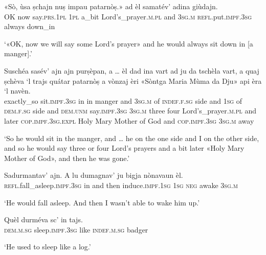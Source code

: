 \begin{linenumbers}
\gll  «Sò, ùsa ṣchajn nuṣ impau patarnòṣ.» ad èl samatév’ adina giùdajn.  \\
OK now say.\textsc{prs.1pl} \textsc{1pl} a\_bit  Lord’s\_prayer.\textsc{m.pl} and \textsc{3sg.m} \textsc{refl}.put.\textsc{impf.3sg} always down\_in  \\
\end{linenumbers}
\medskip
\glt `«OK, now we will say some Lord’s prayer» and he would always sit down in [a manger].'
\medskip

\begin{linenumbers}
\gll Suschéa sasév’ ajn ajn purṣèpan, a … èl dad ina vart ad ju da tschèla vart, a quaj ṣchèva `l trajs quátar  patarnòṣ a vònzaj èri «Sòntga Maria Mùma da Dju» api èra `l navèn.\\
exactly\_so sit.\textsc{impf.3sg} in in manger and {} \textsc{3sg.m} of \textsc{indef.f.sg} side and \textsc{1sg} of \textsc{dem.f.sg} side and \textsc{dem.unm} say.\textsc{impf.3sg} \textsc{3sg.m} three four Lord’s\_prayer.\textsc{m.pl} and later \textsc{cop.impf.3sg.expl} Holy Mary Mother of God and \textsc{cop.impf.3sg} \textsc{3sg.m} away\\
\end{linenumbers}
\medskip
\glt `So he would sit in the manger, and … he on the one side and I on the other side, and so he would say three or four Lord’s prayers and a bit later «Holy Mary Mother of God», and then he was gone.'
\medskip

\begin{linenumbers}
\gll  Sadurmantav’ ajn. A lu dumagnav’ ju bigja nònavaun èl.  \\
 \textsc{refl}.fall\_asleep.\textsc{impf.3sg} in and then induce.\textsc{impf.1sg} \textsc{1sg} \textsc{neg} awake \textsc{3sg.m}\\
\end{linenumbers}
\medskip
\glt `He would fall asleep. And  then I wasn't able to wake him up.'
\medskip

\begin{linenumbers}
\gll  Quèl durméva sc’ in tajs.  \\
 \textsc{dem.m.sg} sleep.\textsc{impf.3sg} like \textsc{indef.m.sg} badger\\
\end{linenumbers}
\medskip
\glt `He used to sleep like a log.'
\medskip

